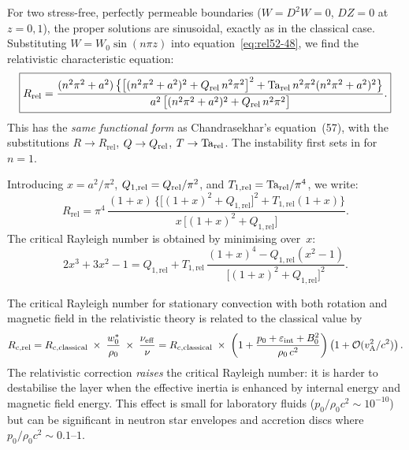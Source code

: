 For two stress-free, perfectly permeable boundaries ($W = D^{2}W = 0$,
$DZ = 0$ at $z=0,1$), the proper solutions are sinusoidal, exactly
as in the classical case.  Substituting $W = W_{0}\sin(n\pi z)$ into
equation~\eqref{eq:rel52-48}, we find the relativistic characteristic
equation:
\begin{equation}
  \boxed{
  R_{\mathrm{rel}}
  = \frac{(n^{2}\pi^{2}+a^{2})\,
    \bigl\{\bigl[(n^{2}\pi^{2}+a^{2})^{2}
      +Q_{\mathrm{rel}}\,n^{2}\pi^{2}\bigr]^{2}
    +\mathrm{Ta}_{\mathrm{rel}}\,n^{2}\pi^{2}(n^{2}\pi^{2}+a^{2})^{2}\bigr\}}
    {a^{2}\,\bigl[(n^{2}\pi^{2}+a^{2})^{2}
      +Q_{\mathrm{rel}}\,n^{2}\pi^{2}\bigr]}.
  }
  \label{eq:rel52-57}
\end{equation}
This has the \emph{same functional form} as Chandrasekhar's
equation~(57), with the substitutions $R\to R_{\mathrm{rel}}$,
$Q\to Q_{\mathrm{rel}}$, $T\to\mathrm{Ta}_{\mathrm{rel}}$.  The instability first sets in for
$n=1$.

Introducing $x = a^{2}/\pi^{2}$,
$Q_{1,\mathrm{rel}} = Q_{\mathrm{rel}}/\pi^{2}$, and
$T_{1,\mathrm{rel}} = \mathrm{Ta}_{\mathrm{rel}}/\pi^{4}$, we write:
\begin{equation}
  R_{\mathrm{rel}} = \pi^{4}\,\frac{(1+x)\,
    \bigl\{\bigl[(1+x)^{2}+Q_{1,\mathrm{rel}}\bigr]^{2}
    +T_{1,\mathrm{rel}}(1+x)\bigr\}}
    {x\,\bigl[(1+x)^{2}+Q_{1,\mathrm{rel}}\bigr]}.
  \label{eq:rel52-59}
\end{equation}
The critical Rayleigh number is obtained by minimising over~$x$:
\begin{equation}
  2x^{3}+3x^{2}-1
  = Q_{1,\mathrm{rel}}
  + T_{1,\mathrm{rel}}\,
    \frac{(1+x)^{4}-Q_{1,\mathrm{rel}}(x^{2}-1)}
         {\bigl[(1+x)^{2}+Q_{1,\mathrm{rel}}\bigr]^{2}}.
  \label{eq:rel52-61}
\end{equation}

\begin{relcorrection}
The critical Rayleigh number for stationary convection with both
rotation and magnetic field in the relativistic theory is related to
the classical value by
\begin{equation}
  R_{c,\mathrm{rel}}
  = R_{c,\mathrm{classical}}\;\times\;
  \frac{w^{*}_{0}}{\rho_{0}}\;\times\;
  \frac{\nu_{\mathrm{eff}}}{\nu}
  = R_{c,\mathrm{classical}}\;\times\;
  \left(1 + \frac{p_{0}+\varepsilon_{\mathrm{int}}+B_{0}^{2}}
                  {\rho_{0}\,c^{2}}\right)
  \left(1 + \mathcal{O}(v_{\mathrm{A}}^{2}/c^{2})\right).
  \label{eq:rel52-Rc-relation}
\end{equation}
The relativistic correction \emph{raises} the critical Rayleigh number:
it is harder to destabilise the layer when the effective inertia is
enhanced by internal energy and magnetic field energy.  This effect is
small for laboratory fluids ($p_{0}/\rho_{0}c^{2}\sim 10^{-10}$) but
can be significant in neutron star envelopes and accretion discs where
$p_{0}/\rho_{0}c^{2}\sim 0.1$--$1$.
\end{relcorrection}

